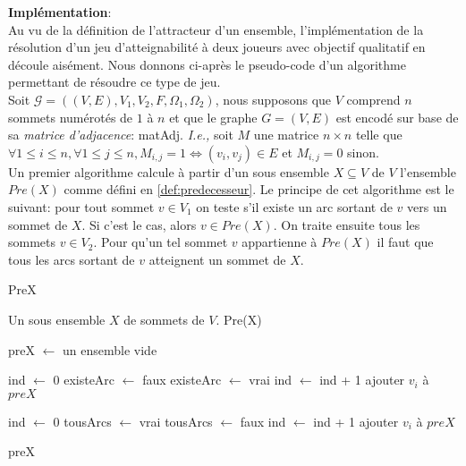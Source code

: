 \noindent\textbf{Implémentation}:\\

Au vu de la définition de l'attracteur d'un ensemble, l'implémentation de la résolution d'un jeu d'atteignabilité à deux joueurs avec objectif qualitatif en découle aisément. Nous donnons ci-après le pseudo-code d'un algorithme permettant de résoudre ce type de jeu. \\

Soit $\mathcal{G} = ((V,E),V_{1},V_{2}, F, \Omega _{1}, \Omega _{2})$, nous supposons que $V$ comprend $n$ sommets numérotés de $1$ à $n$ et que le graphe $G = (V,E)$ est encodé sur base de sa \textit{matrice d'adjacence}: matAdj. \emph{I.e.,} soit $M$ une matrice $ n \times n $ telle que $ \forall 1 \leq i \leq n, \forall 1\leq j \leq n , M_{i,j} = 1 \Leftrightarrow (v_{i},v_{j})\in E $ et $M_{i,j} = 0$ sinon.\\

Un premier algorithme calcule à partir d'un sous ensemble $X \subseteq V$ de $V$ l'ensemble $Pre(X)$ comme défini en \ref{def:predecesseur}. Le principe de cet algorithme est le suivant: pour tout sommet $v\in V_{1}$ on teste s'il existe un arc sortant de $v$ vers un sommet de $X$. Si c'est le cas, alors $v\in Pre(X)$. On traite ensuite tous les sommets $v \in V_{2}$. Pour qu'un tel sommet $v$ appartienne à $Pre(X)$ il faut que tous les arcs sortant de $v$ atteignent un sommet de $X$.

\begin{algorithm}
	\caption{PreX}
	\begin{algorithmic}[1]
		\REQUIRE Un sous ensemble $X$ de sommets de $V$.
		\ENSURE Pre(X)
		
		\STATE preX $\leftarrow$ un ensemble vide
		
			\STATE ind $\leftarrow$ 0
			\STATE existeArc $\leftarrow$ faux
					\STATE existeArc $\leftarrow$ vrai
				\ELSE
					\STATE ind $\leftarrow$ ind + 1
				\ENDIF
			\ENDWHILE
				\STATE ajouter $v_{i}$ à $preX$
			\ENDIF
		\ENDFOR
		
			\STATE ind $\leftarrow$ 0
			\STATE tousArcs $\leftarrow$ vrai
					\STATE tousArcs $\leftarrow$ faux
				\ELSE
					\STATE ind $\leftarrow$ ind + 1
				\ENDIF
			\ENDWHILE
				\STATE ajouter $v_{i}$ à $preX$
			\ENDIF
		\ENDFOR
		
		\RETURN preX
			
\end{algorithmic}
		
\end{algorithm}

